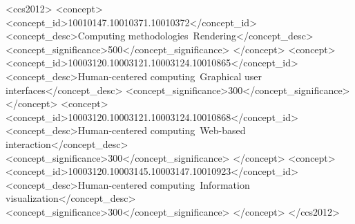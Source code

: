 \documentclass[sigconf]{acmart}
\begin{document}
\begin{CCSXML}
<ccs2012>
   <concept>
       <concept_id>10010147.10010371.10010372</concept_id>
       <concept_desc>Computing methodologies~Rendering</concept_desc>
       <concept_significance>500</concept_significance>
       </concept>
   <concept>
       <concept_id>10003120.10003121.10003124.10010865</concept_id>
       <concept_desc>Human-centered computing~Graphical user interfaces</concept_desc>
       <concept_significance>300</concept_significance>
       </concept>
   <concept>
       <concept_id>10003120.10003121.10003124.10010868</concept_id>
       <concept_desc>Human-centered computing~Web-based interaction</concept_desc>
       <concept_significance>300</concept_significance>
       </concept>
   <concept>
       <concept_id>10003120.10003145.10003147.10010923</concept_id>
       <concept_desc>Human-centered computing~Information visualization</concept_desc>
       <concept_significance>300</concept_significance>
       </concept>
 </ccs2012>
\end{CCSXML}


\end{document}
